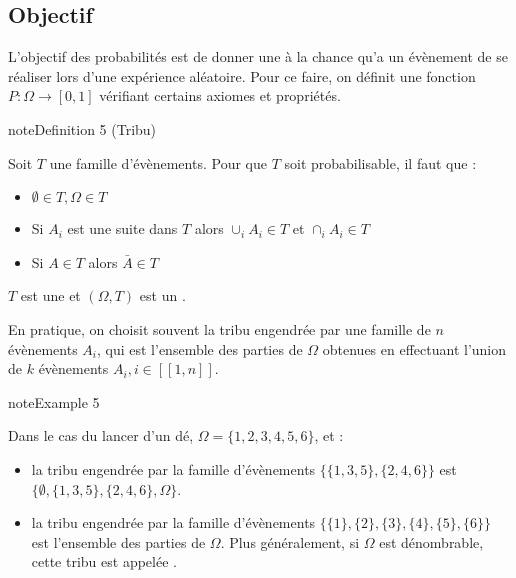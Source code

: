 \documentclass[letterpaper,10pt,french]{sphinxmanual}
\begin{document}
\subsection{Objectif}
\label{\detokenize{Rappels:objectif}}
\sphinxAtStartPar
L’objectif des probabilités est de donner une  à la chance qu’a un évènement de se réaliser lors d’une expérience aléatoire. Pour ce faire, on définit une fonction \(P:\Omega\rightarrow [0,1]\) vérifiant certains axiomes et propriétés.

\ignorespaces \label{Rappels:tribu}
\begin{sphinxadmonition}{note}{Definition 5 (Tribu)}



\sphinxAtStartPar
Soit \(T\) une famille d’évènements. Pour que \(T\) soit probabilisable, il faut que :
\begin{itemize}
\item {} 
\sphinxAtStartPar
\(\emptyset\in T, \Omega\in T\)

\item {} 
\sphinxAtStartPar
Si \(A_i\) est une suite dans \(T\) alors \(\cup_iA_i\in T\) et \(\cap_iA_i\in T\)

\item {} 
\sphinxAtStartPar
Si \(A\in T\) alors \(\bar A\in T\)

\end{itemize}

\sphinxAtStartPar
\(T\) est une  et \((\Omega,T)\) est un .
\end{sphinxadmonition}

\sphinxAtStartPar
En pratique, on choisit souvent la tribu engendrée par une famille de \(n\) évènements \(A_i\), qui est l’ensemble des parties de \(\Omega\) obtenues en effectuant l’union de \(k\) évènements \(A_i,i\in [\![1,n]\!]\).
\label{Rappels:example-8}
\begin{sphinxadmonition}{note}{Example 5}



\sphinxAtStartPar
Dans le cas du lancer d’un dé, \(\Omega = \{1,2,3,4,5,6\}\), et :
\begin{itemize}
\item {} 
\sphinxAtStartPar
la tribu engendrée par la famille d’évènements \(\{\{1,3,5\},\{2,4,6\}\}\) est \(\{\emptyset,\{1,3,5\},\{2,4,6\},\Omega\}\).

\item {} 
\sphinxAtStartPar
la tribu engendrée par la famille d’évènements \(\{\{1\},\{2\},\{3\},\{4\},\{5\},\{6\}\}\) est l’ensemble des parties de \(\Omega\). Plus généralement, si \(\Omega\) est dénombrable, cette tribu est appelée .

\end{itemize}
\end{sphinxadmonition}
\end{document}
